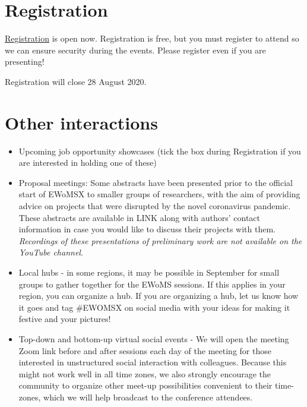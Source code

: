 \documentclass[
  12pt,
]{book}
\begin{document}
\hypertarget{registration}{%
\section{Registration}\label{registration}}

\href{https://cardiffunipsych.eu.qualtrics.com/jfe/form/SV_0VYX845gbq54Arr}{Registration} is open now. Registration is free, but you must register to attend so we can ensure security during the events. Please register even if you are presenting!

Registration will close 28 August 2020.

\hypertarget{other-interactions}{%
\section{Other interactions}\label{other-interactions}}

\begin{itemize}
\item
  Upcoming job opportunity showcases (tick the box during Registration if you are interested in holding one of these)
\item
  Proposal meetings: Some abstracts have been presented prior to the official start of EWoMSX to smaller groups of researchers, with the aim of providing advice on projects that were disrupted by the novel coronavirus pandemic. These abstracts are available in LINK along with authors' contact information in case you would like to discuss their projects with them. \emph{Recordings of these presentations of preliminary work are not available on the YouTube channel}.
\item
  Local hubs - in some regions, it may be possible in September for small groups to gather together for the EWoMS sessions. If this applies in your region, you can organize a hub. If you are organizing a hub, let us know how it goes and tag \#EWOMSX on social media with your ideas for making it festive and your pictures!
\item
  Top-down and bottom-up virtual social events - We will open the meeting Zoom link before and after sessions each day of the meeting for those interested in unstructured social interaction with colleagues. Because this might not work well in all time zones, we also strongly encourage the community to organize other meet-up possibilities convenient to their time-zones, which we will help broadcast to the conference attendees.
\end{itemize}
\end{document}
